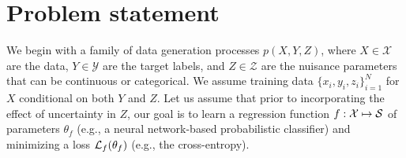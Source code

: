 \documentclass[twocolumn,superscriptaddress,aps]{revtex4-1}
\theoremstyle{plain}
\begin{document}
\section{Problem statement}
\label{sec:problem}
%
%

We begin with a family of data generation processes $p(X,Y,Z)$, where $X \in \mathcal{X}$ are
the data, $Y\in \mathcal{Y}$ are the target labels, and $Z\in \mathcal{Z}$ are the nuisance parameters that
can be continuous or categorical. We assume training
data $\{x_i, y_i, z_i\}_{i=1}^N$ for $X$ conditional on both $Y$ and $Z$.
Let us assume that prior to incorporating the effect of uncertainty in $Z$,
our goal is to learn a
regression function $f : \mathcal{X} \mapsto {\cal S}$ of parameters
$\theta_f$ (e.g., a neural network-based probabilistic classifier) and
minimizing  a loss ${\cal L}_f(\theta_f)$ (e.g., the cross-entropy).
\end{document}
